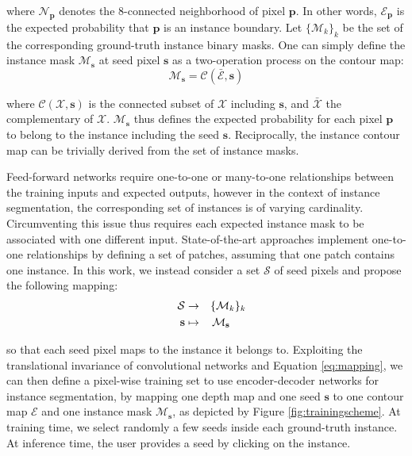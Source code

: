 \documentclass[runningheads,a4paper]{llncs}
\begin{document}
\noindent where $\mathcal{N}_\mathbf{p}$ denotes the 8-connected neighborhood of pixel $\mathbf{p}$. In other words, $\mathcal{E}_\mathbf{p}$ is the expected probability that $\mathbf{p}$ is an instance boundary. Let $\{\mathcal{M}_k\}_{k}$ be the set of the corresponding ground-truth instance binary masks. One can simply define the instance mask $\mathcal{M}_\mathbf{s}$ at seed pixel $\mathbf{s}$ as a two-operation process on the contour map:
\begin{equation}\label{eq:duality}
\mathcal{M}_\mathbf{s} = \mathcal{C}(\bar{\mathcal{E}}, \mathbf{s})
\end{equation}

\noindent where $\mathcal{C}(\mathcal{X}, \mathbf{s})$ is the connected subset of $\mathcal{X}$ including $\mathbf{s}$, and $\bar{\mathcal{X}}$ the complementary of $\mathcal{X}$. $\mathcal{M}_\mathbf{s}$ thus defines the expected probability for each pixel $\mathbf{p}$ to belong to the instance including the seed $\mathbf{s}$. Reciprocally, the instance contour map can be trivially derived from the set of instance masks. 

Feed-forward networks require one-to-one or many-to-one relationships between the training inputs and expected outputs, however in the context of instance segmentation, the corresponding set of instances is of varying cardinality. Circumventing this issue thus requires each expected instance mask to be associated with one different input. State-of-the-art approaches \cite{SharpMask} implement one-to-one relationships by defining a set of patches, assuming that one patch contains one instance. In this work, we instead consider a set $\mathcal{S}$ of seed pixels and propose the following mapping:
\begin{equation}\label{eq:mapping}
\begin{aligned}
\quad \mathcal{S} & \to & \{\mathcal{M}_k\}_k\\
\mathbf{s} & \mapsto & \mathcal{M}_\mathbf{s}\hspace{.5cm}
\end{aligned}
\end{equation}

\noindent so that each seed pixel maps to the instance it belongs to. Exploiting the translational invariance of convolutional networks and Equation \ref{eq:mapping}, we can then define a pixel-wise training set to use encoder-decoder networks for instance segmentation, by mapping one depth map and one seed $\mathbf{s}$ to one contour map $\mathcal{E}$ and one instance mask $\mathcal{M}_\mathbf{s}$, as depicted by Figure \ref{fig:trainingscheme}. At training time, we select randomly a few seeds inside each ground-truth instance. At inference time, the user provides a seed by clicking on the instance.
\end{document}
